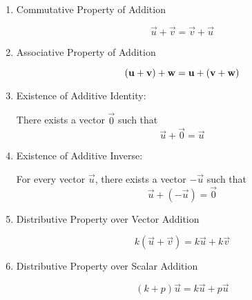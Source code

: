 \documentclass{ximera}
\begin{document}
  \begin{enumerate}
  \item 
  Commutative Property of Addition
\begin{expandable}  
  $$\vec{u}+\vec{v}=\vec{v}+\vec{u}$$
\end{expandable}  

  \item 
  Associative Property of Addition
  \begin{expandable}
  $$(\vec{u}+\vec{v})+{\bf w}=\vec{u}+(\vec{v}+{\bf w})$$
   \end{expandable}

  \item 
  Existence of Additive Identity: 
  \begin{expandable}There exists a vector $\vec{0}$ such that
  $$\vec{u}+\vec{0}=\vec{u}$$
  \end{expandable}

  \item 
  Existence of Additive Inverse: 
  \begin{expandable}For every vector $\vec{u}$, there exists a vector $-\vec{u}$ such that
  $$\vec{u}+(-\vec{u})=\vec{0}$$
  \end{expandable}

  \item
  Distributive Property over Vector Addition
  \begin{expandable}
  $$k(\vec{u}+\vec{v})=k\vec{u}+k\vec{v}$$
  \end{expandable}

  \item
  Distributive Property over Scalar Addition
  \begin{expandable}
  $$(k+p)\vec{u}=k\vec{u}+p\vec{u}$$
  \end{expandable}


\end{enumerate}
\end{document}
